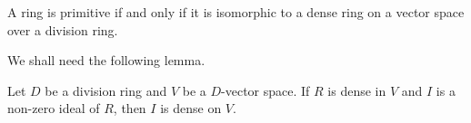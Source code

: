 %
%
%
%


\begin{theorem}[Jacobson]
	\label{thm:density}
	A ring is primitive if and only if it is isomorphic to a dense ring on 
	a vector space over a division ring.
\end{theorem}

We shall need the following lemma. 

\begin{lemma}
	\label{lem:ideal_denso}
	Let $D$ be a division ring and $V$ be a $D$-vector space. 
	If $R$ is dense in $V$ and $I$ is a non-zero ideal of $R$, then 
	$I$ is dense on $V$. 
\end{lemma}

